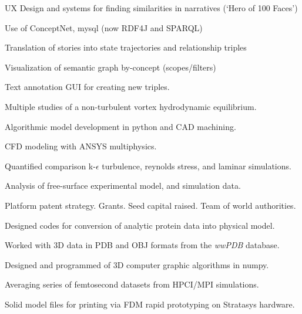 \documentclass[letterpaper]{deedy-resume} %
\begin{document}
\begin{minipage}[t]{1\textwidth}


UX Design and systems for finding similarities in narratives (‘Hero of 100 Faces’)
\begin{tightitemize}
\item Use of ConceptNet, mysql (now RDF4J and SPARQL)
\item Translation of stories into state trajectories and relationship triples
\item Visualization of semantic graph by-concept (scopes/filters)
\item Text annotation GUI for creating new triples.
\end{tightitemize}

\sectionspace %





\vspace{\topsep} %
Multiple studies of a non-turbulent vortex hydrodynamic equilibrium.
\begin{tightitemize}
\item Algorithmic model development in python and CAD machining.
\item CFD modeling with ANSYS multiphysics.
\item Quantified comparison k-$\epsilon$ turbulence, reynolds stress, and laminar simulations.
\item Analysis of free-surface experimental model, and simulation data.
\item Platform patent strategy.  Grants. Seed capital raised. Team of world authorities.
\end{tightitemize}

\sectionspace %



\begin{tightitemize}
\item Designed codes for conversion of analytic protein data into physical model.
\item Worked with 3D data in PDB and OBJ formats from the \textit{wwPDB} database.
\item Designed and programmed of 3D computer graphic algorithms in numpy.
\item Averaging series of femtosecond datasets from HPCI/MPI simulations.
\item Solid model files for printing via FDM rapid prototyping on Stratasys hardware.
\end{tightitemize}


\end{minipage}
\end{document}

